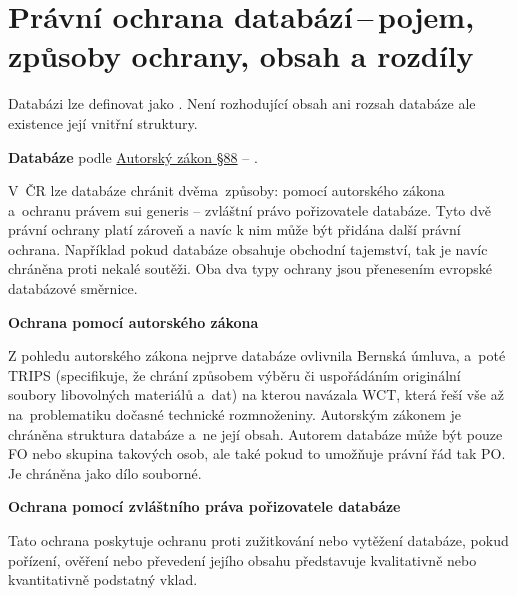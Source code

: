 \newpage
\section{Právní ochrana databází\,--\,pojem, způsoby ochrany, obsah a rozdíly}


Databázi lze definovat jako . Není rozhodující obsah ani rozsah databáze ale existence její vnitřní struktury. 
\vspace{0.2cm}

\textbf{Databáze} podle \href{https://www.zakonyprolidi.cz/cs/2000-121#p88}{Autorský zákon §88} -- .

\vspace{0.3cm}
V~ČR lze databáze chránit dvěma~způsoby: pomocí autorského zákona a~ochranu právem sui generis -- zvláštní právo pořizovatele databáze. Tyto dvě právní ochrany platí zároveň a navíc k nim může být přidána další právní ochrana. Například pokud databáze obsahuje obchodní tajemství, tak je navíc chráněna proti nekalé soutěži. Oba dva typy ochrany jsou přenesením evropské databázové směrnice.

\vspace{0.3cm}
\begin{Large}
\textbf{Ochrana pomocí autorského zákona}
\end{Large}

Z pohledu autorského zákona nejprve databáze ovlivnila Bernská úmluva, a~poté TRIPS (specifikuje, že chrání způsobem výběru či uspořádáním originální soubory libovolných materiálů a~dat) na kterou navázala WCT, která řeší vše až na~problematiku dočasné technické rozmnoženiny. Autorským zákonem je chráněna struktura databáze a~ne její obsah. Autorem databáze může být pouze FO nebo skupina takových osob, ale také pokud to umožňuje právní řád tak PO. Je chráněna jako dílo souborné.

\vspace{0.3cm}
\begin{Large}
\textbf{Ochrana pomocí zvláštního práva pořizovatele databáze}
\end{Large}

Tato ochrana poskytuje ochranu proti zužitkování nebo vytěžení databáze, pokud pořízení, ověření nebo převedení jejího obsahu představuje kvalitativně nebo kvantitativně podstatný vklad.

